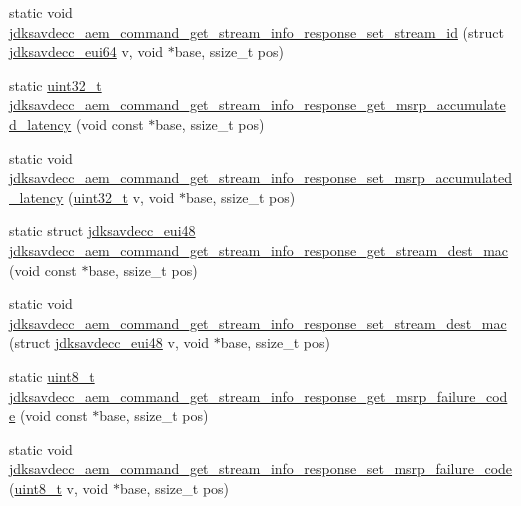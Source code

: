 \begin{DoxyCompactItemize}
\item 
static void \hyperlink{group__command__get__stream__info__response_ga5b88824a01fd1557fd8d9c9af0902de8}{jdksavdecc\+\_\+aem\+\_\+command\+\_\+get\+\_\+stream\+\_\+info\+\_\+response\+\_\+set\+\_\+stream\+\_\+id} (struct \hyperlink{structjdksavdecc__eui64}{jdksavdecc\+\_\+eui64} v, void $\ast$base, ssize\+\_\+t pos)
\item 
static \hyperlink{parse_8c_a6eb1e68cc391dd753bc8ce896dbb8315}{uint32\+\_\+t} \hyperlink{group__command__get__stream__info__response_gadb7c867b9a119e2954e0571040afbf73}{jdksavdecc\+\_\+aem\+\_\+command\+\_\+get\+\_\+stream\+\_\+info\+\_\+response\+\_\+get\+\_\+msrp\+\_\+accumulated\+\_\+latency} (void const $\ast$base, ssize\+\_\+t pos)
\item 
static void \hyperlink{group__command__get__stream__info__response_gae5d24383ac04e508fe222a7d9231d9c8}{jdksavdecc\+\_\+aem\+\_\+command\+\_\+get\+\_\+stream\+\_\+info\+\_\+response\+\_\+set\+\_\+msrp\+\_\+accumulated\+\_\+latency} (\hyperlink{parse_8c_a6eb1e68cc391dd753bc8ce896dbb8315}{uint32\+\_\+t} v, void $\ast$base, ssize\+\_\+t pos)
\item 
static struct \hyperlink{structjdksavdecc__eui48}{jdksavdecc\+\_\+eui48} \hyperlink{group__command__get__stream__info__response_ga7af5b92a59616d75d3eaef854b288286}{jdksavdecc\+\_\+aem\+\_\+command\+\_\+get\+\_\+stream\+\_\+info\+\_\+response\+\_\+get\+\_\+stream\+\_\+dest\+\_\+mac} (void const $\ast$base, ssize\+\_\+t pos)
\item 
static void \hyperlink{group__command__get__stream__info__response_gab7b570d46123ac09475d95c447605e5d}{jdksavdecc\+\_\+aem\+\_\+command\+\_\+get\+\_\+stream\+\_\+info\+\_\+response\+\_\+set\+\_\+stream\+\_\+dest\+\_\+mac} (struct \hyperlink{structjdksavdecc__eui48}{jdksavdecc\+\_\+eui48} v, void $\ast$base, ssize\+\_\+t pos)
\item 
static \hyperlink{stdint_8h_aba7bc1797add20fe3efdf37ced1182c5}{uint8\+\_\+t} \hyperlink{group__command__get__stream__info__response_gafe1f00653ff44ce4d64da0d4a93afb91}{jdksavdecc\+\_\+aem\+\_\+command\+\_\+get\+\_\+stream\+\_\+info\+\_\+response\+\_\+get\+\_\+msrp\+\_\+failure\+\_\+code} (void const $\ast$base, ssize\+\_\+t pos)
\item 
static void \hyperlink{group__command__get__stream__info__response_ga696d62227335e8bebc49ca8d40a3ce21}{jdksavdecc\+\_\+aem\+\_\+command\+\_\+get\+\_\+stream\+\_\+info\+\_\+response\+\_\+set\+\_\+msrp\+\_\+failure\+\_\+code} (\hyperlink{stdint_8h_aba7bc1797add20fe3efdf37ced1182c5}{uint8\+\_\+t} v, void $\ast$base, ssize\+\_\+t pos)

\end{DoxyCompactItemize}
